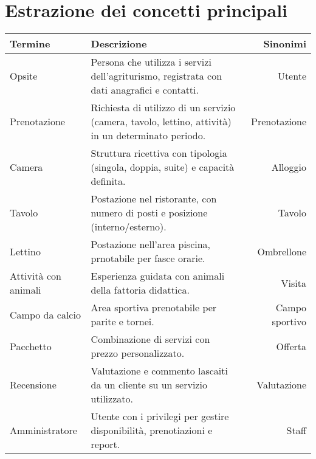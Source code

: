 \documentclass[a4paper,11pt]{report}
\begin{document}
\section{Estrazione dei concetti principali}
\begin{center}
    \begin{tabularx}{\textwidth}{ l X r }
        \rowcolor{blue!30}
        \textbf{Termine}     & \textbf{Descrizione}                                                                                & \textbf{Sinonimi} \\
        \hline
        Opsite               & Persona che utilizza i servizi dell'agriturismo, registrata con dati anagrafici e contatti.         & Utente            \\
        \hline
        Prenotazione         & Richiesta di utilizzo di un servizio (camera, tavolo, lettino, attività) in un determinato periodo. & Prenotazione      \\
        \hline
        Camera               & Struttura ricettiva con tipologia (singola, doppia, suite) e capacità definita.                     & Alloggio          \\
        \hline
        Tavolo               & Postazione nel ristorante, con numero di posti e posizione (interno/esterno).                       & Tavolo            \\
        \hline
        Lettino              & Postazione nell'area piscina, prnotabile per fasce orarie.                                          & Ombrellone        \\
        \hline
        Attività con animali & Esperienza guidata con animali della fattoria didattica.                                            & Visita            \\
        \hline
        Campo da calcio      & Area sportiva prenotabile per parite e tornei.                                                      & Campo sportivo    \\
        \hline
        Pacchetto            & Combinazione di servizi con prezzo personalizzato.                                                  & Offerta           \\
        \hline
        Recensione           & Valutazione e commento lascaiti da un cliente su un servizio utilizzato.                            & Valutazione       \\
        \hline
        Amministratore       & Utente con i privilegi per gestire disponibilità, prenotiazioni e report.                           & Staff             \\

\end{tabularx}
\end{center}
\end{document}
